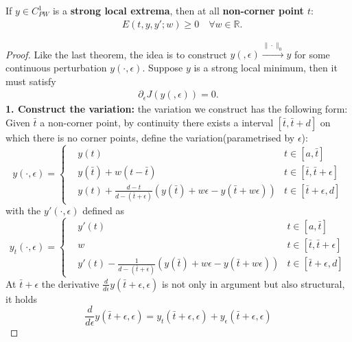 \begin{theorem}If $y \in C_{PW}^1$ is a \textbf{strong local extrema}, then at all \textbf{non-corner point $t$}:
	\begin{equation}
	\begin{aligned}
		& E(t, y, y'; w) \ge 0 \quad \forall w \in \mathbb{R}. 
	\end{aligned}
	\end{equation}
\end{theorem}
\begin{proof}
Like the last theorem, the idea is to construct $y(, \epsilon) \overset{\|\cdot\|_0}{\longrightarrow} y$ for some continuous perturbation $y(\cdot, \epsilon)$. Suppose $y$ is a strong local minimum, then it must satisfy
\begin{align*}
	\partial_\epsilon J(y(, \epsilon)) = 0.
\end{align*}
\textbf{1. Construct the variation:}
the variation we construct has the following form: Given $\bar{t}$ a non-corner point, by continuity there exists a interval $[\bar{t}, \bar{t} + d]$ on which there is no corner points, define the variation(parametrised by $\epsilon$):
\begin{equation*}
	y(\cdot, \epsilon) = 
	\left\{
	\begin{aligned}
		& y(t)  & t \in [a, \bar{t}] \\
		& y(\bar{t}) + w (t - \bar{t}) & t \in [\bar{t}, \bar{t} + \epsilon]\\
		& y(t) + \frac{d - t}{d - (\bar{t} + \epsilon)}(y(\bar{t}) + w \epsilon - y(\bar{t} + w \epsilon)) & t \in [\bar{t} + \epsilon, d]
	\end{aligned}
	\right.
\end{equation*}
with the $y'(\cdot, \epsilon)$ defined as
\begin{equation*}
	y_t(\cdot, \epsilon) = 
	\left\{
	\begin{aligned}
		& y'(t)  & t \in [a, \bar{t}] \\
		& w  & t \in [\bar{t}, \bar{t} + \epsilon]\\
		& y'(t) - \frac{1}{d - (\bar{t} + \epsilon)}(y(\bar{t}) + w \epsilon - y(\bar{t} + w \epsilon)) & t \in [\bar{t} + \epsilon, d]
	\end{aligned}
	\right.
\end{equation*}
At $\bar{t} + \epsilon$ the derivative $\frac{d}{d\epsilon} y( \bar{t} + \epsilon, \epsilon)$ is not only in argument but also structural, it holds
\begin{equation}
	\frac{d}{d\epsilon}y(\bar{t} + \epsilon, \epsilon) = y_t(\bar{t}+ \epsilon, \epsilon) + y_\epsilon(\bar{t} + \epsilon, \epsilon)
\end{equation}



\end{proof}
